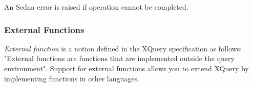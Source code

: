 \documentclass[a4paper,12pt]{article}
\begin{document}
An Sedna error is raised if operation cannot be completed.


%


\subsubsection{External Functions}
\emph{External function} is a notion defined in the XQuery specification \cite{paper:query-language} as follows:
"External functions are functions that are implemented outside the query environment".
Support for external functions allows you to extend XQuery by implementing
functions in other languages.
\end{document}

